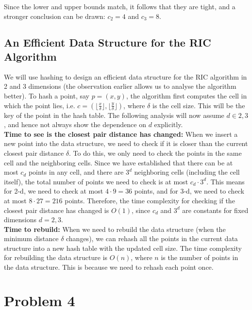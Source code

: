 \documentclass[a4paper]{article}
\begin{document}
\noindent
Since the lower and upper bounds match, it follows that they are tight, and a stronger conclusion can be drawn: $c_2 = 4$ and $c_3 = 8$.

\vspace{0.2in}
\subsection*{An Efficient Data Structure for the RIC Algorithm}

We will use hashing to design an efficient data structure for the RIC algorithm in 2 and 3 dimensions (the observation earlier allows us to analyse the algorithm better). To hash a point, say $p = (x, y)$, the algorithm first computes the cell in which the point lies, i.e. $c = (\lfloor \frac{x}{\delta} \rfloor, \lfloor \frac{y}{\delta} \rfloor)$, where $\delta$ is the cell size. This will be the key of the point in the hash table. The following analysis will now assume $d \in {2, 3}$, and hence not always show the dependence on $d$ explicitly.\\

\noindent
\textbf{Time to see is the closest pair distance has changed:} When we insert a new point into the data structure, we need to check if it is closer than the current closest pair distance $\delta$. To do this, we only need to check the points in the same cell and the neighboring cells. Since we have established that there can be at most $c_d$ points in any cell, and there are $3^d$ neighboring cells (including the cell itself), the total number of points we need to check is at most $c_d \cdot 3^d$. This means for 2-d, we need to check at most $4 \cdot 9 = 36$ points, and for 3-d, we need to check at most $8 \cdot 27 = 216$ points. Therefore, the time complexity for checking if the closest pair distance has changed is $O(1)$, since $c_d$ and $3^d$ are constants for fixed dimensions $d = 2, 3$.\\

\noindent
\textbf{Time to rebuild:} When we need to rebuild the data structure (when the minimum distance $\delta$ changes), we can rehash all the points in the current data structure into a new hash table with the updated cell size. The time complexity for rebuilding the data structure is $O(n)$, where $n$ is the number of points in the data structure. This is because we need to rehash each point once.\\


\newpage
\section*{Problem 4}
\end{document}
